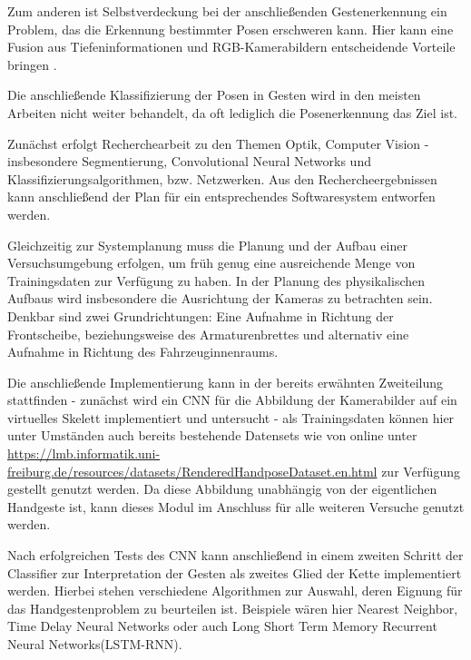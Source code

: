 \documentclass[12pt, a4paper]{book}
\begin{document}
Zum anderen ist Selbstverdeckung bei der anschließenden Gestenerkennung ein Problem, das die Erkennung bestimmter Posen erschweren kann. Hier kann eine Fusion aus Tiefeninformationen und RGB-Kamerabildern entscheidende Vorteile bringen \cite{Keskin2012}.

Die anschließende Klassifizierung der Posen in Gesten wird in den meisten Arbeiten nicht weiter behandelt, da oft lediglich die Posenerkennung das Ziel ist.

Zunächst erfolgt Recherchearbeit zu den Themen Optik, Computer Vision - insbesondere Segmentierung, Convolutional Neural Networks und Klassifizierungsalgorithmen, bzw. Netzwerken. Aus den Rechercheergebnissen kann anschließend der Plan für ein entsprechendes Softwaresystem entworfen werden.

Gleichzeitig zur Systemplanung muss die Planung und der Aufbau einer Versuchsumgebung erfolgen, um früh genug eine ausreichende Menge von Trainingsdaten zur Verfügung zu haben.
In der Planung des physikalischen Aufbaus wird insbesondere die Ausrichtung der Kameras zu betrachten sein. Denkbar sind zwei Grundrichtungen: Eine Aufnahme in Richtung der Frontscheibe, beziehungsweise des Armaturenbrettes und alternativ eine Aufnahme in Richtung des Fahrzeuginnenraums. 

Die anschließende Implementierung kann in der bereits erwähnten Zweiteilung stattfinden - zunächst wird ein CNN für die Abbildung der Kamerabilder auf ein virtuelles Skelett implementiert und untersucht - als Trainingsdaten können hier unter Umständen auch bereits bestehende Datensets wie von \cite{Zimmermann03.05.2017} online unter \url{https://lmb.informatik.uni-freiburg.de/resources/datasets/RenderedHandposeDataset.en.html} zur Verfügung gestellt genutzt werden. Da diese Abbildung unabhängig von der eigentlichen Handgeste ist, kann dieses Modul im Anschluss für alle weiteren Versuche genutzt werden. 

Nach erfolgreichen Tests des CNN kann anschließend in einem zweiten Schritt der Classifier zur Interpretation der Gesten als zweites Glied der Kette implementiert werden. Hierbei stehen verschiedene Algorithmen zur Auswahl, deren Eignung für das Handgestenproblem zu beurteilen ist. Beispiele wären hier Nearest Neighbor, Time Delay Neural Networks oder auch Long Short Term Memory Recurrent Neural Networks(LSTM-RNN).\\
\end{document}
